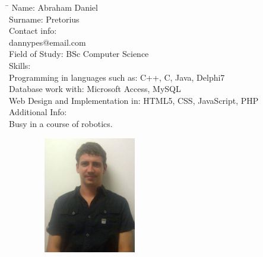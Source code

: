 \documentclass[12pt]{article}
\begin{document}
	\begin{tabbing}
		\hspace*{3.5cm}\=\hspace*{3cm} \kill
		Name: \> Abraham Daniel \\
		Surname: \>  Pretorius \\
		Contact info:  \\
			\> dannypes@email.com	\\	
		Field of Study: \> BSc Computer Science \\
		Skills: \\
			\> Programming in languages such as: C++, C, Java, Delphi7 \\
			\> Database work with: Microsoft Access, MySQL \\
			\> Web Design and Implementation in: HTML5, CSS, JavaScript, PHP \\
		Additional Info: \\
			\> Busy in a course of robotics. \\		
	\end{tabbing}
	
	\begin{figure}[ht!]
		\centering
		\includegraphics[width=2in, height=2in]{./Pictures/JohanEsterhuyse.png}
	\end{figure}
	
\end{document}
